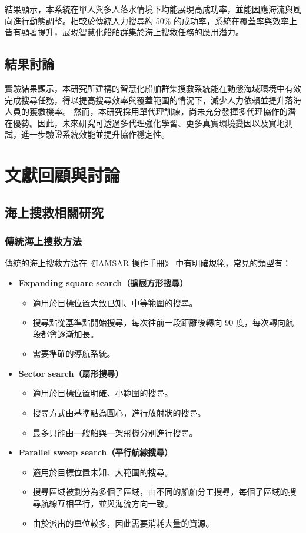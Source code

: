 \documentclass[12pt,a4paper]{article}
\begin{document}
結果顯示，本系統在單人與多人落水情境下均能展現高成功率，並能因應海流與風向進行動態調整。相較於傳統人力搜尋約 50\% 的成功率，系統在覆蓋率與效率上皆有顯著提升，展現智慧化船舶群集於海上搜救任務的應用潛力。


\subsection{結果討論}
實驗結果顯示，本研究所建構的智慧化船舶群集搜救系統能在動態海域環境中有效完成搜尋任務，得以提高搜尋效率與覆蓋範圍的情況下，減少人力依賴並提升落海人員的獲救機率。  然而，本研究採用單代理訓練，尚未充分發揮多代理協作的潛在優勢。因此，未來研究可透過多代理強化學習、更多真實環境變因以及實地測試，進一步驗證系統效能並提升協作穩定性。



\newpage

\section{文獻回顧與討論}

\subsection{海上搜救相關研究}

\subsubsection{傳統海上搜救方法}
傳統的海上搜救方法在《IAMSAR 操作手冊》\cite{IAMSAR2008} 中有明確規範，常見的類型有：
\begin{itemize}
	\item \textbf{Expanding square search（擴展方形搜尋）}
	\begin{itemize}
		\item 適用於目標位置大致已知、中等範圍的搜尋。
		\item 搜尋點從基準點開始搜尋，每次往前一段距離後轉向 90 度，每次轉向航段都會逐漸加長。
		\item 需要準確的導航系統。
	\end{itemize}
	\item \textbf{Sector search（扇形搜尋）}
	\begin{itemize}
		\item 適用於目標位置明確、小範圍的搜尋。
		\item 搜尋方式由基準點為圓心，進行放射狀的搜尋。
		\item 最多只能由一艘船與一架飛機分別進行搜尋。
	\end{itemize}
	\item \textbf{Parallel sweep search（平行航線搜尋）}
	\begin{itemize}
		\item 適用於目標位置未知、大範圍的搜尋。
		\item 搜尋區域被劃分為多個子區域，由不同的船舶分工搜尋，每個子區域的搜尋航線互相平行，並與海流方向一致。
		\item 由於派出的單位較多，因此需要消耗大量的資源。
	\end{itemize}
\end{itemize}
\end{document}

